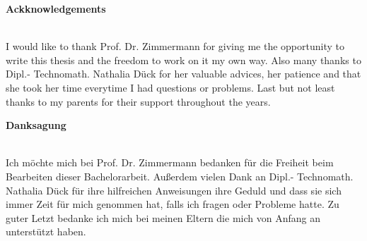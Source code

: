 

\begin{center}
\large \textbf{Ackknowledgements} \\
~\\ %


\end{center}
I would like to thank Prof. Dr. Zimmermann for giving me the opportunity to write this thesis and the freedom to work on it my own way. Also many thanks to Dipl.- Technomath. Nathalia Dück for her valuable advices, her patience and that she took her time everytime I had questions or problems. Last but not least thanks to my parents for their support throughout the years. 

\vfill %
\begin{center}
\large \textbf{Danksagung} \\
~\\ %
\end{center}
Ich möchte mich bei Prof. Dr. Zimmermann bedanken für die Freiheit beim Bearbeiten dieser Bachelorarbeit. Außerdem vielen Dank an Dipl.- Technomath. Nathalia Dück für ihre hilfreichen Anweisungen ihre Geduld und dass sie sich immer Zeit für mich genommen hat, falls ich fragen oder Probleme hatte. Zu guter Letzt bedanke ich mich bei meinen Eltern die mich von Anfang an unterstützt haben.